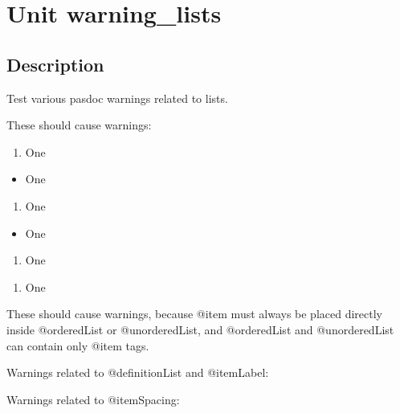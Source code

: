 \documentclass{report}
\begin{document}
\newlength{\tmplength}
\chapter{Unit warning{\_}lists}
\section{Description}
Test various pasdoc warnings related to lists.\hfill\vspace*{1ex}



These should cause warnings: \begin{enumerate}
\setcounter{enumi}{0} \setcounter{enumii}{0} \setcounter{enumiii}{0} \setcounter{enumiv}{0} 
\item One
\end{enumerate} \begin{itemize}
\item One
\end{itemize} \begin{enumerate}
\setcounter{enumi}{0} \setcounter{enumii}{0} \setcounter{enumiii}{0} \setcounter{enumiv}{0} 
\item One
\end{enumerate} \begin{itemize}
\item One
\end{itemize} \begin{enumerate}
\setcounter{enumi}{0} \setcounter{enumii}{0} \setcounter{enumiii}{0} \setcounter{enumiv}{0} 
\item One
\end{enumerate} \begin{enumerate}
\setcounter{enumi}{0} \setcounter{enumii}{0} \setcounter{enumiii}{0} \setcounter{enumiv}{0} 
\item One
\end{enumerate}

These should cause warnings, because @item must always be placed directly inside @orderedList or @unorderedList, and @orderedList and @unorderedList can contain only @item tags.

   \begin{ttfamily}  \end{ttfamily}

Warnings related to @definitionList and @itemLabel:



Warnings related to @itemSpacing:

 
\end{document}

